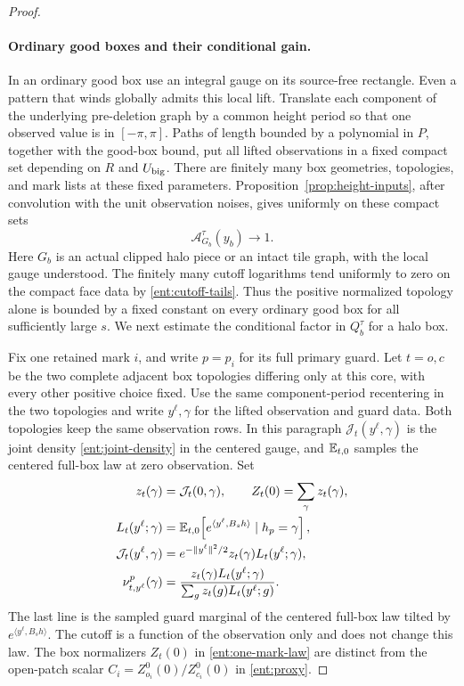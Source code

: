 \begin{proof}
\paragraph{Ordinary good boxes and their conditional gain.}
In an ordinary good box use an integral gauge on its source-free
rectangle.  Even a pattern that winds globally admits this local
lift.  Translate each component of the underlying pre-deletion graph
by a common height period so that one observed value is in
\([-\pi,\pi]\).  Paths of length bounded by a polynomial in \(P\),
together with the good-box bound, put all lifted observations in a
fixed compact set depending on \(R\) and \(U_{\rm big}\).  There are
finitely many box geometries, topologies, and mark lists at these
fixed parameters.  Proposition~\ref{prop:height-inputs}, after
convolution with the unit observation noises, gives uniformly on
these compact sets
\[
                    \mathcal A_{G_b}^\tau(y_b)\longrightarrow1 .
\]
Here \(G_b\) is an actual clipped halo piece or an intact tile graph,
with the local gauge understood.  The finitely many cutoff logarithms
tend uniformly to zero on the compact face data by
\eqref{ent:cutoff-tails}.  Thus the positive normalized topology
alone is bounded by a fixed constant on every ordinary good box for
all sufficiently large \(s\).  We next estimate the conditional
factor in \(Q_b^\tau\) for a halo box.

Fix one retained mark \(i\), and write \(p=p_i\) for its full primary
guard.  Let \(t=o,c\) be the two complete adjacent box topologies
differing only at this core, with every other positive choice fixed.
Use the same component-period recentering in the two topologies and
write \(y^\ell,\gamma\) for the lifted observation and guard data.
Both topologies keep the same observation rows.  In this paragraph
\(\mathcal J_t(y^\ell,\gamma)\) is the joint density
\eqref{ent:joint-density} in the centered gauge, and
\(\mathbb E_{t,0}\) samples the centered full-box law at zero observation.
Set
\begin{equation}\label{ent:one-mark-law}
\begin{split}
 z_t(\gamma)&=\mathcal J_t(0,\gamma),\qquad
 Z_t(0)=\sum_\gamma z_t(\gamma),\\
 L_t(y^\ell;\gamma)
   &=\mathbb E_{t,0}\!\left[e^{\langle y^\ell,B_sh\rangle}
                                      \mid h_p=\gamma\right],\\
 \mathcal J_t(y^\ell,\gamma)
   &=e^{-\|y^\ell\|^2/2}z_t(\gamma)L_t(y^\ell;\gamma),\\
 \nu_{t,y^\ell}^p(\gamma)
   &=\frac{z_t(\gamma)L_t(y^\ell;\gamma)}
           {\sum_g z_t(g)L_t(y^\ell;g)}.
\end{split}
\end{equation}
The last line is the sampled guard marginal of the centered full-box
law tilted by \(e^{\langle y^\ell,B_sh\rangle}\).  The cutoff is a
function of the observation only and does not change this law.
The box normalizers \(Z_t(0)\) in \eqref{ent:one-mark-law} are
distinct from the open-patch scalar
\(C_i=Z_{o_i}^0(0)/Z_{c_i}^0(0)\) in \eqref{ent:proxy}.


\end{proof}

